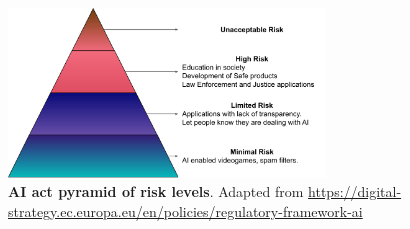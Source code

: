 \begin{figure}[H]
    \centering
    \includegraphics[width=0.75\textwidth]{fig/rel/common/img/AI_act_pyramid.pdf}
    \caption{\textbf{AI act pyramid of risk levels}. Adapted from \url{https://digital-strategy.ec.europa.eu/en/policies/regulatory-framework-ai}}
    \label{fig:rel_AIact}
\end{figure}